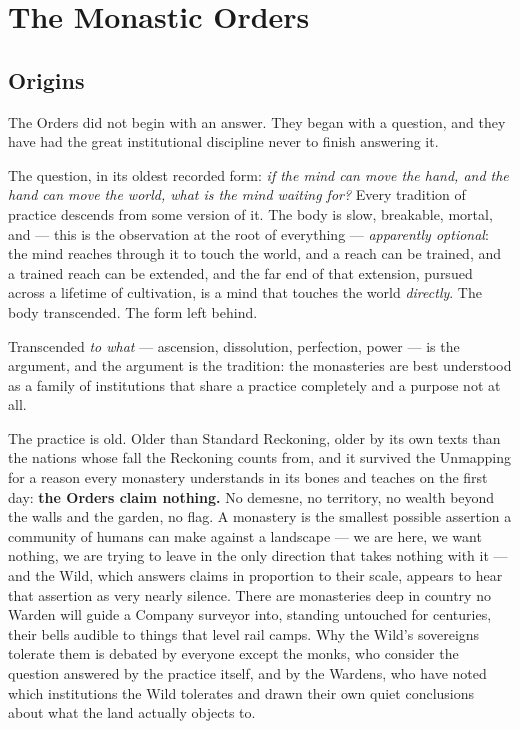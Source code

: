 \section{The Monastic Orders}

\subsection{Origins}

The Orders did not begin with an answer. They began with a question, and they have had the great institutional discipline never to finish answering it.

The question, in its oldest recorded form: \textit{if the mind can move the hand, and the hand can move the world, what is the mind waiting for?} Every tradition of practice descends from some version of it. The body is slow, breakable, mortal, and --- this is the observation at the root of everything --- \textit{apparently optional}: the mind reaches through it to touch the world, and a reach can be trained, and a trained reach can be extended, and the far end of that extension, pursued across a lifetime of cultivation, is a mind that touches the world \textit{directly}. The body transcended. The form left behind.

Transcended \textit{to what} --- ascension, dissolution, perfection, power --- is the argument, and the argument is the tradition: the monasteries are best understood as a family of institutions that share a practice completely and a purpose not at all.

The practice is old. Older than Standard Reckoning, older by its own texts than the nations whose fall the Reckoning counts from, and it survived the Unmapping for a reason every monastery understands in its bones and teaches on the first day: \textbf{the Orders claim nothing.} No demesne, no territory, no wealth beyond the walls and the garden, no flag. A monastery is the smallest possible assertion a community of humans can make against a landscape --- we are here, we want nothing, we are trying to leave in the only direction that takes nothing with it --- and the Wild, which answers claims in proportion to their scale, appears to hear that assertion as very nearly silence. There are monasteries deep in country no Warden will guide a Company surveyor into, standing untouched for centuries, their bells audible to things that level rail camps. Why the Wild's sovereigns tolerate them is debated by everyone except the monks, who consider the question answered by the practice itself, and by the Wardens, who have noted which institutions the Wild tolerates and drawn their own quiet conclusions about what the land actually objects to.

